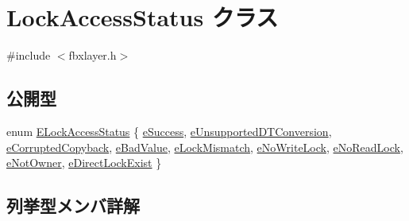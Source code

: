 \hypertarget{class_lock_access_status}{}\section{Lock\+Access\+Status クラス}
\label{class_lock_access_status}


{\ttfamily \#include $<$fbxlayer.\+h$>$}

\subsection*{公開型}
\begin{DoxyCompactItemize}
\item 
enum \hyperlink{class_lock_access_status_a3314dad01b38dd90f5393e108a07b3c1}{E\+Lock\+Access\+Status} \{ \newline
\hyperlink{class_lock_access_status_a3314dad01b38dd90f5393e108a07b3c1a4752cb677cd6e0773a183026891015d2}{e\+Success}, 
\hyperlink{class_lock_access_status_a3314dad01b38dd90f5393e108a07b3c1aff6857643db00dac38b2a47ec38349cd}{e\+Unsupported\+D\+T\+Conversion}, 
\hyperlink{class_lock_access_status_a3314dad01b38dd90f5393e108a07b3c1a843d354729b050835958be016bfbc25e}{e\+Corrupted\+Copyback}, 
\hyperlink{class_lock_access_status_a3314dad01b38dd90f5393e108a07b3c1a121af28b9da26b3788e913667f5204b3}{e\+Bad\+Value}, 
\newline
\hyperlink{class_lock_access_status_a3314dad01b38dd90f5393e108a07b3c1a75ff4df964ba8cf5caf0e9e97f4dd2b1}{e\+Lock\+Mismatch}, 
\hyperlink{class_lock_access_status_a3314dad01b38dd90f5393e108a07b3c1ab996ac48091e53ae688b050d659cb914}{e\+No\+Write\+Lock}, 
\hyperlink{class_lock_access_status_a3314dad01b38dd90f5393e108a07b3c1aaebdb6e01670d0283da340a09f5cd3e7}{e\+No\+Read\+Lock}, 
\hyperlink{class_lock_access_status_a3314dad01b38dd90f5393e108a07b3c1a9e208d564a70b003d7dfd591d0319cd4}{e\+Not\+Owner}, 
\newline
\hyperlink{class_lock_access_status_a3314dad01b38dd90f5393e108a07b3c1a8f66f2ab4d7d4ee48ba0ce835ad2047f}{e\+Direct\+Lock\+Exist}
 \}
\end{DoxyCompactItemize}


\subsection{列挙型メンバ詳解}
\mbox{\label{class_lock_access_status_a3314dad01b38dd90f5393e108a07b3c1}} 
